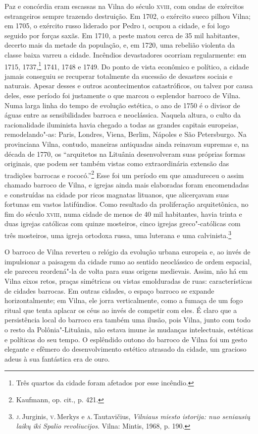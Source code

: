 Paz e concórdia eram escassas na Vilna do século \textsc{xviii}, com ondas de
exércitos estrangeiros sempre trazendo destruição. Em 1702, o exército
sueco pilhou Vilna; em 1705, o exército russo liderado por Pedro \textsc{i},
ocupou a cidade, e foi logo seguido por forças saxãs. Em 1710, a peste
matou cerca de 35 mil habitantes, decerto mais da metade da
população, e, em 1720, uma rebelião violenta da classe baixa varreu a
cidade. Incêndios devastadores ocorriam regularmente: em 1715, 1737,\footnote{Três quartos da cidade foram afetados por esse incêndio.} 1741, 1748 e
1749. Do ponto de vista econômico e político, a cidade jamais conseguiu
se recuperar totalmente da sucessão de desastres sociais e naturais.
Apesar desses e outros acontecimentos catastróficos, ou talvez por causa
deles, esse período foi justamente o que marcou o esplendor barroco de
Vilna. Numa larga linha do tempo de evolução estética, o ano de 1750 é o
divisor de águas entre as sensibilidades barroca e neoclássica. Naquela
altura, o culto da racionalidade iluminista havia chegado a todas as
grandes capitais europeias, remodelando"-as: Paris, Londres, Viena,
Berlim, Nápoles e São Petersburgo. Na provinciana Vilna, contudo,
maneiras antiquadas ainda reinavam supremas e, na década de 1770, os
``arquitetos na Lituânia desenvolveram suas próprias formas originais,
que podem ser também vistas como extraordinária extensão das tradições
barrocas e rococó.''\footnote{Kaufmann, op. cit., p. 421.} Esse foi um
período em que amadureceu o assim chamado barroco de Vilna, e igrejas
ainda mais elaboradas foram encomendadas e construídas na cidade por
ricos magnatas lituanos, que alicerçavam suas fortunas em vastos
latifúndios. Como resultado da proliferação arquitetônica, no fim do
século \textsc{xviii}, numa cidade de menos de 40 mil habitantes, havia trinta
e duas igrejas católicas com quinze mosteiros, cinco igrejas
greco"-católicas com três mosteiros, uma igreja ortodoxa russa, uma
luterana e uma calvinista.\footnote{\textsc{j}.\,Jurginis, \textsc{v}.\,Merkys e \textsc{a}.\,Tautavičius, \textit{Vilniaus miesto istorija: nuo seniausių laikų iki Spalio revoliucijos}. Vilna: Mintis, 1968, p. 190.}

O barroco de Vilna reverteu o relógio da evolução urbana europeia e, ao
invés de impulsionar a paisagem da cidade rumo ao sentido neoclássico de
ordem espacial, ele pareceu reordená"-la de volta para suas origens
medievais. Assim, não há em Vilna eixos retos, praças simétricas ou
vistas emolduradas de ruas: características de cidades barrocas. Em
outras cidades, o espaço barroco se expande horizontalmente; em Vilna,
ele jorra verticalmente, como a fumaça de um fogo ritual que tenta
aplacar os céus ao invés de competir com eles. É claro que a
persistência local do barroco era também uma ilusão, pois Vilna, junto
com todo o resto da Polônia"-Lituânia, não estava imune às mudanças
intelectuais, estéticas e políticas do seu tempo. O esplêndido outono do
barroco de Vilna foi um gesto elegante e efêmero do desenvolvimento
estético atrasado da cidade, um gracioso adeus à sua fantástica era de
ouro.

